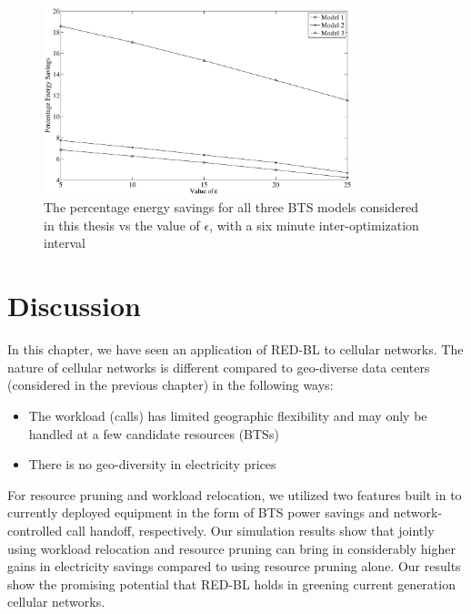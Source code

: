 \begin{figure}
\centering
\includegraphics[width=0.8\textwidth]{pics/epsilonresults.eps}
\caption{The percentage energy savings for all three BTS models considered in this thesis vs the value of $\epsilon$, with a six minute inter-optimization interval}
\label{fig:case2:results6}
\end{figure}

\section{Discussion}
\label{sec:discuss:case2} In this chapter, we have seen an application of RED-BL to cellular networks. The nature of cellular networks is different compared to geo-diverse data centers (considered in the previous chapter) in the following ways:

\begin{itemize}
\item The workload (calls) has limited geographic flexibility and may only be handled at a few candidate resources (BTSs)
\item There is no geo-diversity in electricity prices
\end{itemize}

For resource pruning and workload relocation, we utilized two features built in to currently deployed equipment in the form of BTS power savings and network-controlled call handoff, respectively. Our simulation results show that jointly using workload relocation and resource pruning can bring in considerably higher gains in electricity savings compared to using resource pruning alone. Our results show the promising potential that RED-BL holds in greening current generation cellular networks.
